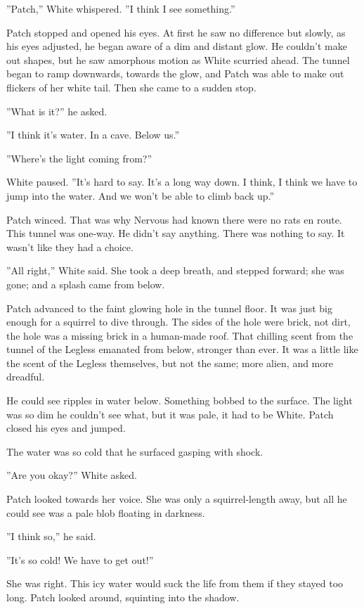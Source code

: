 \documentclass[12pt]{book}
\begin{document}
 ''Patch,'' White whispered. ''I think I see something.''\par
 Patch stopped and opened his eyes. At first he saw no difference %
 but slowly, as his eyes adjusted, he began aware of a dim and distant glow. He couldn't make out shapes, but he saw amorphous motion as White scurried ahead. The tunnel began to ramp downwards, towards the glow, and Patch was able to make out flickers of her white tail. Then she came to a sudden stop.\par
 ''What is it?'' he asked.\par
 ''I think it's water. In a cave. Below us.''\par
 ''Where's the light coming from?''\par
 White paused. ''It's hard to say. It's a long way down. I think, I think we have to jump into the water. And we won't be able to climb back up.''\par
 Patch winced. That was why Nervous had known there were no rats en route. This tunnel was one-way. He didn't say anything. There was nothing to say. It wasn't like they had a choice.\par
 ''All right,'' White said. She took a deep breath, and stepped forward; she was gone; and a splash came from below.\par
 Patch advanced to the faint glowing hole in the tunnel floor. It was just big enough for a squirrel to dive through. The sides of the hole were brick, not dirt, the hole was a missing brick in a human-made roof. That chilling scent from the tunnel of the Legless emanated from below, stronger than ever. It was a little like the scent of the Legless themselves, but not the same; more alien, and more dreadful.\par
He could see ripples in water below. Something bobbed to the surface. The light was so dim he couldn't see what, but it was pale, it had to be White. Patch closed his eyes and jumped.\par
The water was so cold that he surfaced gasping with shock.\par
 ''Are you okay?'' White asked.\par
 Patch looked towards her voice. She was only a squirrel-length away, but all he could see was a pale blob floating in darkness.\par
 ''I think so,'' he said.\par
 ''It's so cold! We have to get out!''\par
 She was right. This icy water would suck the life from them if they stayed too long. Patch looked around, squinting into the shadow.\par
\end{document}
